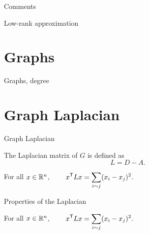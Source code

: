 \documentclass{beamer}
\begin{document}
\begin{frame}[t]{Comments}
	\grid

\end{frame}

\begin{frame}[t]{Low-rank approximation}
	\grid

\end{frame}

\section{Graphs}

\begin{frame}[t]{Graphs, degree}
	\grid

\end{frame}

\section{Graph Laplacian}

\begin{frame}[t]{Graph Laplacian}
	\grid

	\vspace{-0.4cm}
	\begin{definition}
		The Laplacian matrix of $G$ is defined as
		$$
		L = D - A.
		$$
	\end{definition}

	\pause
	\vspace{-0.5cm}
	\begin{exampleblock}{}
		For all $x \in \mathbb{R}^n$,
		$\displaystyle \qquad
		x^{\sT} L x = \sum_{i \sim j} (x_i - x_j)^2.
		\vspace{-0.1cm}
		$
	\end{exampleblock}
\end{frame}


\begin{frame}[t]{Properties of the Laplacian}
	\grid

	\vspace{-0.8cm}
	\begin{exampleblock}{}
		For all $x \in \mathbb{R}^n$,
		$\displaystyle \qquad
		x^{{\sf T}} L x = \sum_{i \sim j} (x_i - x_j)^2.
		$
	\end{exampleblock}


	\pause
	\pause
\end{frame}
\end{document}

